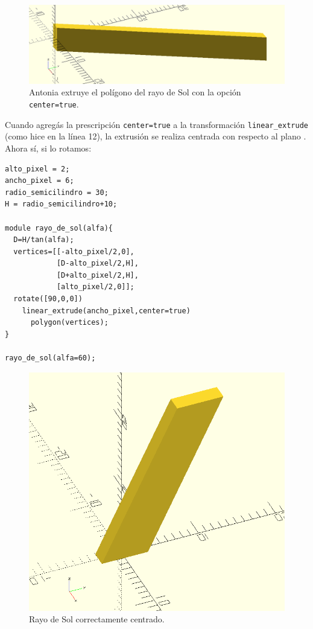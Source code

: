 \begin{figure}[ht]
  \centering
  \includegraphics[width=.8\textwidth]{imagenes/rayo-extrudido-3}  
  \caption{Antonia extruye el polígono del rayo de Sol con la opción
    \lstinline!center=true!.}
  \label{fig:rayo-extrudido-3}
\end{figure}


\guillemotright Cuando agregás la prescripción \lstinline!center=true!
a la transformación \lstinline!linear_extrude! (como hice en la línea
12), la extrusión se realiza centrada con respecto al plano
. Ahora sí, si lo rotamos:



    \begin{lstlisting}
alto_pixel = 2;
ancho_pixel = 6;
radio_semicilindro = 30;
H = radio_semicilindro+10;

module rayo_de_sol(alfa){
  D=H/tan(alfa);
  vertices=[[-alto_pixel/2,0],
            [D-alto_pixel/2,H],
            [D+alto_pixel/2,H],
            [alto_pixel/2,0]];
  rotate([90,0,0])
    linear_extrude(ancho_pixel,center=true)
      polygon(vertices);
}
 
rayo_de_sol(alfa=60);
\end{lstlisting}


\begin{figure}[ht]
  \centering
\includegraphics[width=.5\textwidth]{imagenes/rayo-extrudido-4}  
  \caption{Rayo de Sol correctamente centrado.}
  \label{fig:rayo-extrudido-4}
\end{figure}



